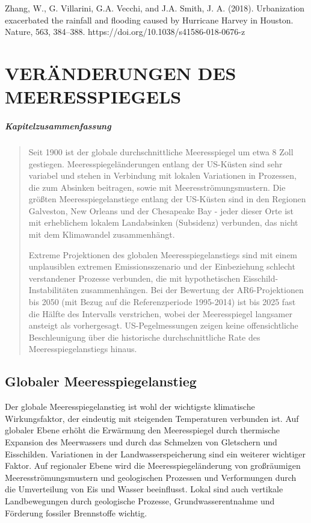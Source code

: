 \documentclass[12pt,paper=a4,DIV=12,parskip=never,chapterprefix=false,headings=standardclasses]{scrreprt}
\newcommand{\FigureNumbersByChapter}{%
  \counterwithout{figure}{section}%
  \counterwithin{figure}{chapter}%
}
\begin{document}
Zhang, W., G. Villarini, G.A. Vecchi, and J.A. Smith, J. A. (2018). Urbanization exacerbated the rainfall
and flooding caused by Hurricane Harvey in Houston. Nature, 563, 384–388.
https://doi.org/10.1038/s41586-018-0676-z
\endgroup


\cleardoublepage
\FigureNumbersByChapter 
\chapter{VERÄNDERUNGEN DES MEERESSPIEGELS}
\paragraph{Kapitelzusammenfassung}
\begin{quote}
Seit 1900 ist der globale durchschnittliche Meeresspiegel um etwa 8 Zoll gestiegen. Meeresspiegeländerungen entlang der US-Küsten sind sehr variabel und stehen in Verbindung mit lokalen Variationen in Prozessen, die zum Absinken beitragen, sowie mit Meeresströmungsmustern. Die größten Meeresspiegelanstiege entlang der US-Küsten sind in den Regionen Galveston, New Orleans und der Chesapeake Bay - jeder dieser Orte ist mit erheblichem lokalem Landabsinken (Subsidenz) verbunden, das nicht mit dem Klimawandel zusammenhängt.

Extreme Projektionen des globalen Meeresspiegelanstiegs sind mit einem unplausiblen extremen Emissionsszenario und der Einbeziehung schlecht verstandener Prozesse verbunden, die mit hypothetischen Eisschild-Instabilitäten zusammenhängen. Bei der Bewertung der AR6-Projektionen bis 2050 (mit Bezug auf die Referenzperiode 1995-2014) ist bis 2025 fast die Hälfte des Intervalls verstrichen, wobei der Meeresspiegel langsamer ansteigt als vorhergesagt. US-Pegelmessungen zeigen keine offensichtliche Beschleunigung über die historische durchschnittliche Rate des Meeresspiegelanstiegs hinaus.
\end{quote}

\section{Globaler Meeresspiegelanstieg}
Der globale Meeresspiegelanstieg ist wohl der wichtigste klimatische Wirkungsfaktor, der eindeutig mit steigenden Temperaturen verbunden ist. Auf globaler Ebene erhöht die Erwärmung den Meeresspiegel durch thermische Expansion des Meerwassers und durch das Schmelzen von Gletschern und Eisschilden. Variationen in der Landwasserspeicherung sind ein weiterer wichtiger Faktor. Auf regionaler Ebene wird die Meeresspiegeländerung von großräumigen Meeresströmungsmustern und geologischen Prozessen und Verformungen durch die Umverteilung von Eis und Wasser beeinflusst. Lokal sind auch vertikale Landbewegungen durch geologische Prozesse, Grundwasserentnahme und Förderung fossiler Brennstoffe wichtig.
\end{document}
